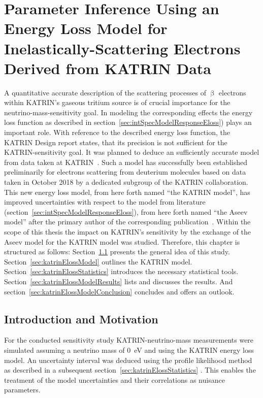 \def\currentRootFolder{chapter/sensitivityStudyWithPreliminaryKatrinElossModel}
\def\currentFigureFolder{\currentRootFolder/fig}

\chapter{Parameter Inference Using an Energy Loss Model for Inelastically-Scattering Electrons Derived from KATRIN Data}
\label{sec:katrinEloss}
A quantitative accurate description of the scattering processes of $\upbeta$ electrons within KATRIN's gaseous tritium source is of crucial importance for the neutrino-mass-sensitivity goal. In modeling the corresponding effects the energy loss function as described in section~\ref{sec:intSpecModelResponseEloss}) plays an important role. With reference to the described energy loss function, the KATRIN Design report states, that its precision is not sufficient for the KATRIN-sensitivity goal. It was planned to deduce an sufficiently accurate model from data taken at KATRIN~\cite{Angrik:2005ep}. Such a model has successfully been established preliminarily for electrons scattering from deuterium molecules based on data taken in October 2018 by a dedicated subgroup of the KATRIN collaboration. This new energy loss model, from here forth named ``the KATRIN model'', has improved uncertainties with respect to the model from literature (section~\ref{sec:intSpecModelResponseEloss}), from here forth named ``the Aseev model'' after the primary author of the corresponding publication~\cite{Aseev2000}. Within the scope of this thesis the impact on KATRIN's sensitivity by the exchange of the Aseev model for the KATRIN model was studied. Therefore, this chapter is structured as follows: Section~\ref{sec:katrinElossConcept} presents the general idea of this study. Section~\ref{sec:katrinElossModel} outlines the KATRIN model. Section~\ref{sec:katrinElossStatistics} introduces the necessary statistical tools. Section~\ref{sec:katrinElossModelResults} lists and discusses the results. And section~\ref{sec:katrinElossModelConclusion} concludes and offers an outlook.

\section{Introduction and Motivation}
\label{sec:katrinElossConcept}
For the conducted sensitivity study KATRIN-neutrino-mass measurements were simulated assuming a neutrino mass of \SI{0}{eV} and using the KATRIN energy loss model. An uncertainty interval was deduced using the profile likelihood method as described in a subsequent section~\ref{sec:katrinElossStatistics} . This enables the treatment of the model uncertainties and their correlations as nuisance parameters.

